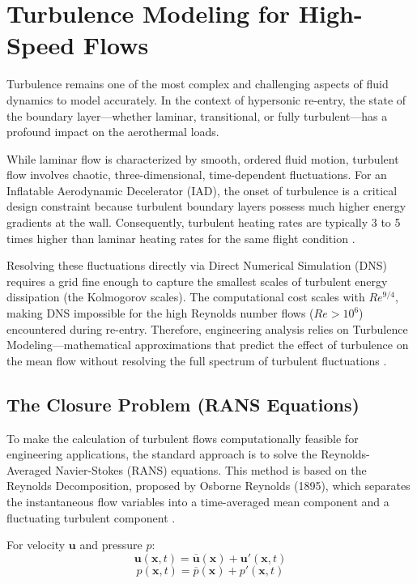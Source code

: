 \section{Turbulence Modeling for High-Speed Flows}
Turbulence remains one of the most complex and challenging aspects of fluid dynamics to model accurately. In the context of hypersonic re-entry, the state of the boundary layer—whether laminar, transitional, or fully turbulent—has a profound impact on the aerothermal loads.
\par
While laminar flow is characterized by smooth, ordered fluid motion, turbulent flow involves chaotic, three-dimensional, time-dependent fluctuations. For an Inflatable Aerodynamic Decelerator (IAD), the onset of turbulence is a critical design constraint because turbulent boundary layers possess much higher energy gradients at the wall. Consequently, turbulent heating rates are typically 3 to 5 times higher than laminar heating rates for the same flight condition \cite{AndersonHypersonic}.
\par
Resolving these fluctuations directly via Direct Numerical Simulation (DNS) requires a grid fine enough to capture the smallest scales of turbulent energy dissipation (the Kolmogorov scales). The computational cost scales with $Re^{9/4}$, making DNS impossible for the high Reynolds number flows ($Re > 10^6$) encountered during re-entry. Therefore, engineering analysis relies on Turbulence Modeling—mathematical approximations that predict the effect of turbulence on the mean flow without resolving the full spectrum of turbulent fluctuations \cite{versteeg2007cfd}.


\subsection{The Closure Problem (RANS Equations)}
To make the calculation of turbulent flows computationally feasible for engineering applications, the standard approach is to solve the Reynolds-Averaged Navier-Stokes (RANS) equations. This method is based on the Reynolds Decomposition, proposed by Osborne Reynolds (1895), which separates the instantaneous flow variables into a time-averaged mean component and a fluctuating turbulent component \cite{versteeg2007cfd}.



For velocity $\mathbf{u}$ and pressure $p$:
\begin{equation}
    \mathbf{u}(\mathbf{x}, t) = \overline{\mathbf{u}}(\mathbf{x}) + \mathbf{u}'(\mathbf{x}, t)
\end{equation}
\begin{equation}
    p(\mathbf{x}, t) = \overline{p}(\mathbf{x}) + p'(\mathbf{x}, t)
\end{equation}

